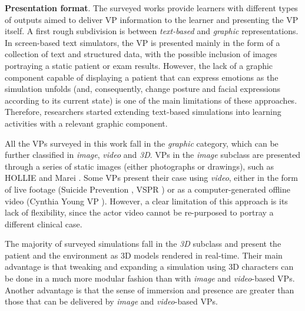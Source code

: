 %


\textbf{Presentation format}. The surveyed works provide learners with different types of outputs aimed to deliver VP information to the learner and presenting the VP itself. A first rough subdivision is between \textit{text-based} and \textit{graphic} representations. In screen-based text simulators, the VP is presented mainly in the form of a collection of text and structured data, with the possible inclusion of images portraying a static patient or exam results. However, the lack of a graphic component capable of displaying a patient that can express emotions as the simulation unfolds (and, consequently, change posture and facial expressions according to its current  state) is one of the main limitations of these approaches. Therefore, researchers started extending text-based simulations into learning activities with a relevant graphic component. 

All the VPs surveyed in this work fall in the \emph{graphic} category, which can be further classified in \emph{image}, \emph{video} and \emph{3D}. VPs in the \emph{image} subclass are presented through a series of static images (either photographs or drawings), such as HOLLIE \cite{adefila2020students} and Marei \cite{marei2018use}.  Some VPs present their case using \emph{video}, either in the form of live footage (Suicide Prevention \cite{o2019suicide}, VSPR \cite{peddle2019exploring,peddle2019development}) or as a computer-generated offline video (Cynthia Young VP \cite{foster2016using}). However, a clear limitation of this approach is its lack of flexibility, since the actor video cannot be re-purposed to portray a different clinical case. 

The majority of surveyed simulations fall in the \emph{3D} subclass and present the patient and the environment as 3D models rendered in real-time.  Their main advantage is that tweaking and expanding a simulation using 3D characters can be done in a much more modular fashion than with \emph{image} and \emph{video}-based VPs. Another advantage is that the sense of immersion and presence are greater than those that can be delivered by \emph{image} and \emph{video}-based VPs. 

